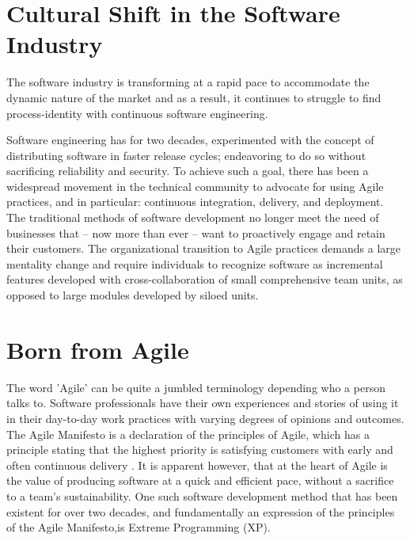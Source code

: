 \documentclass[11pt,a4paper]{article}
\begin{document}

\tableofcontents
\newpage

\section{Cultural Shift in the Software Industry}
The software industry is transforming at a rapid pace to accommodate the dynamic nature of the market and as a result, it continues to struggle to find process-identity with continuous software engineering.

Software engineering has for two decades, experimented with the concept of distributing software in faster release cycles; endeavoring to do so without sacrificing reliability and security. To achieve such a goal, there has been a widespread movement in the technical community to advocate for using Agile practices, and in particular: continuous integration, delivery, and deployment. The traditional methods of software development no longer meet the need of businesses that -- now more than ever -- want to proactively engage and retain their customers. The organizational transition to Agile practices demands a large mentality change and require individuals to recognize software as incremental features developed with cross-collaboration of small comprehensive team units, as opposed to large modules developed by siloed units.

\section{Born from Agile}
The word 'Agile' can be quite a jumbled terminology depending who a person talks to. Software professionals have their own experiences and stories of using it in their day-to-day work practices with varying degrees of opinions and outcomes. The Agile Manifesto is a declaration of the principles of Agile, which has a principle stating that the highest priority is satisfying customers with early and often continuous delivery \cite[p. ~50]{meyer_2014}. It is apparent however, that at the heart of Agile is the value of producing software at a quick and efficient pace, without a sacrifice to a team's sustainability. One such software development method that has been existent for over two decades, and fundamentally an expression of the principles of the Agile Manifesto,is Extreme Programming (XP). 
\end{document}
